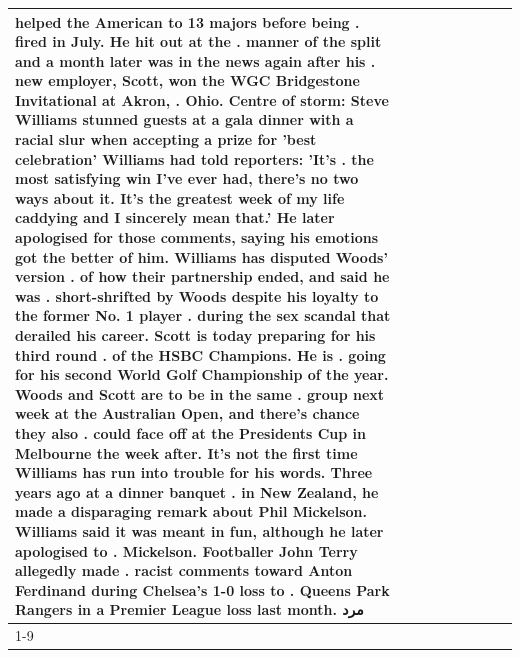 \begin{table}[H]
\begin{tabular}{lllrlllll}
helped the American to 13 majors before being . fired in July. He hit out at the . manner of the split and a month later was in the news again after his . new employer, Scott, won the WGC Bridgestone Invitational at Akron, . Ohio. Centre of storm: Steve Williams stunned guests at a gala dinner with a racial slur when accepting a prize for 'best celebration' Williams had told reporters: 'It's . the most satisfying win I've ever had, there's no two ways about it. It's the greatest week of my life caddying and I sincerely mean that.' He later apologised for those comments, saying his emotions got the better of him. Williams has disputed Woods' version . of how their partnership ended, and said he was . short-shrifted by Woods despite his loyalty to the former No. 1 player . during the sex scandal that derailed his career. Scott is today preparing for his third round . of the HSBC Champions. He is . going for his second World Golf Championship of the year. Woods and Scott are to be in the same . group next week at the Australian Open, and there's chance they also . could face off at the Presidents Cup in Melbourne the week after. It's not the first time Williams has run into trouble for his words. Three years ago at a dinner banquet . in New Zealand, he made a disparaging remark about Phil Mickelson. Williams said it was meant in fun, although he later apologised to . Mickelson. Footballer John Terry allegedly made . racist comments toward Anton Ferdinand during Chelsea's 1-0 loss to . Queens Park Rangers in a Premier League loss last month. مرد \\
\cline{1-9}

\end{tabular}
\end{table}
